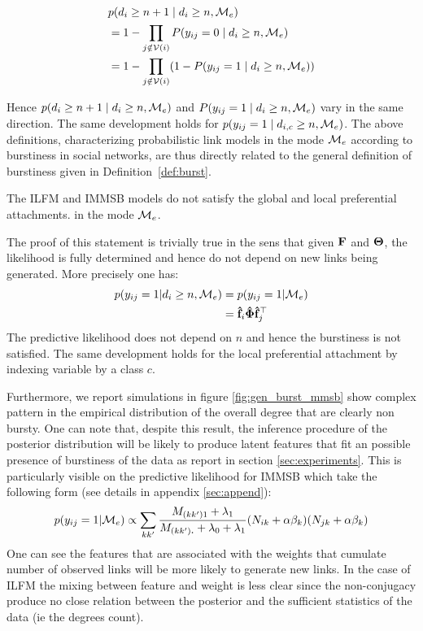 \begin{align}
&p(d_{i} \ge n+1 \mid d_i \ge n, \mathcal{M}_e) \nonumber \\
&= 1 - \prod_{j \notin \mathcal{V}(i)} P(y_{ij} = 0 \mid d_i \ge n, \mathcal{M}_e) \nonumber \\
&= 1 - \prod_{j \notin \mathcal{V}(i)} (1 - P(y_{ij} = 1 \mid d_i \ge n, \mathcal{M}_e)) \nonumber
\end{align}


Hence $p(d_{i} \ge n+1 \mid d_i \ge n, \mathcal{M}_e)$ and $P(y_{ij} = 1 \mid d_i \ge n, \mathcal{M}_e)$ vary in the same direction. The same development holds for $p(y_{ij}=1 \mid d_{i,c} \ge n, \mathcal{M}_e)$. The above definitions, characterizing probabilistic link models in the mode $\mathcal{M}_e$ according to burstiness in social networks, are thus directly related to the general definition of burstiness given in Definition~\ref{def:burst}.




\begin{proposition}
	The ILFM and IMMSB models do not satisfy the global and local preferential attachments. in the mode $\mathcal{M}_e$.
\end{proposition}

The proof of this statement is trivially true in the sens that given $\mathbf{F}$ and $\mathbf{\Theta}$, the likelihood is fully determined and hence do not depend on new links being generated. More precisely one has:
\begin{align}
p(y_{ij}=1| d_i \ge n, \mathcal{M}_e) &= p(y_{ij}=1| \mathcal{M}_e)\\
&= \mathbf{\hat{f}}_{i} \mathbf{\hat{\Phi}} \mathbf{\hat{f}}_j^\top
\end{align}
The predictive likelihood does not depend on $n$ and hence the burstiness is not satisfied. The same development holds for the local preferential attachment by indexing variable by a class $c$.

Furthermore, we report simulations in figure \ref{fig:gen_burst_mmsb} show complex pattern in the empirical distribution of the overall degree that are clearly non bursty. One can note that, despite this result, the inference procedure of the posterior distribution will be likely to produce latent features that fit an possible presence of burstiness of the data as report in section \ref{sec:experiments}. This is particularly visible on the predictive likelihood for IMMSB which take the following form (see details in appendix \ref{sec:append}):
\begin{equation} \label{eq:ppp}
p(y_{ij}=1 | \M_e)\propto \sum_{kk'} \frac{M_{(kk')1} + \lambda_1}{M_{(kk')\bm{.}} + \lambda_0 + \lambda_1}  (N_{ik} + \alpha\beta_k ) (N_{jk} + \alpha\beta_k)
\end{equation}   
One can see the features that are associated with the weights that cumulate number of observed links will be more likely to generate new links. In the case of ILFM the mixing between feature and weight is less clear since the non-conjugacy produce no close relation between the posterior and the sufficient statistics of the data (ie the degrees count). 

